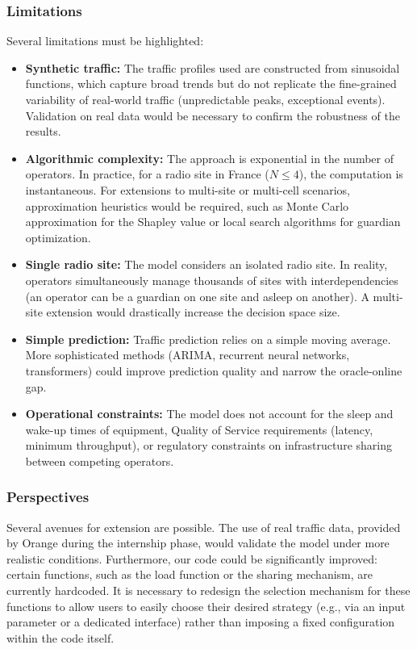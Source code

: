 \subsubsection{Limitations}
Several limitations must be highlighted:
\begin{itemize}
    \item \textbf{Synthetic traffic:} The traffic profiles used are constructed from sinusoidal functions, which capture broad trends but do not replicate the fine-grained variability of real-world traffic (unpredictable peaks, exceptional events). Validation on real data would be necessary to confirm the robustness of the results.
    \item \textbf{Algorithmic complexity:} The approach is exponential in the number of operators. In practice, for a radio site in France ($N \le 4$), the computation is instantaneous. For extensions to multi-site or multi-cell scenarios, approximation heuristics would be required, such as Monte Carlo approximation for the Shapley value or local search algorithms for guardian optimization.
    \item \textbf{Single radio site:} The model considers an isolated radio site. In reality, operators simultaneously manage thousands of sites with interdependencies (an operator can be a guardian on one site and asleep on another). A multi-site extension would drastically increase the decision space size.
    \item \textbf{Simple prediction:} Traffic prediction relies on a simple moving average. More sophisticated methods (ARIMA, recurrent neural networks, transformers) could improve prediction quality and narrow the oracle-online gap.
    \item \textbf{Operational constraints:} The model does not account for the sleep and wake-up times of equipment, Quality of Service requirements (latency, minimum throughput), or regulatory constraints on infrastructure sharing between competing operators.
\end{itemize}

\subsubsection{Perspectives}
Several avenues for extension are possible. The use of real traffic data, provided by Orange during the internship phase, would validate the model under more realistic conditions. Furthermore, our code could be significantly improved: certain functions, such as the load function or the sharing mechanism, are currently hardcoded. It is necessary to redesign the selection mechanism for these functions to allow users to easily choose their desired strategy (e.g., via an input parameter or a dedicated interface) rather than imposing a fixed configuration within the code itself. 

